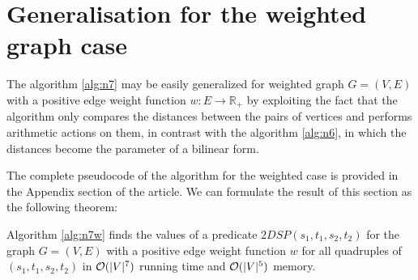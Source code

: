 \section{Generalisation for the weighted graph case}

The algorithm \ref{alg:n7} may be easily generalized for weighted graph $G = (V, E)$ with a positive edge weight function $w : E \rightarrow \mathbb{R}_+$ by exploiting the fact that the algorithm only compares the distances between the pairs of vertices and performs arithmetic actions on them, in contrast with the algorithm \ref{alg:n6}, in which the distances become the parameter of a bilinear form.

The complete pseudocode of the algorithm for the weighted case is provided in the Appendix section of the article. We can formulate the result of this section as the following theorem:

\begin{theorem}
Algorithm \ref{alg:n7w} finds the values of a predicate $2DSP(s_1, t_1, s_2, t_2)$ for the graph $G = (V, E)$ with a positive edge weight function $w$ for all quadruples of $(s_1, t_1, s_2, t_2)$ in $\mathcal{O}(|V|^7)$ running time and $\mathcal{O}(|V|^5)$ memory. 
\end{theorem}
